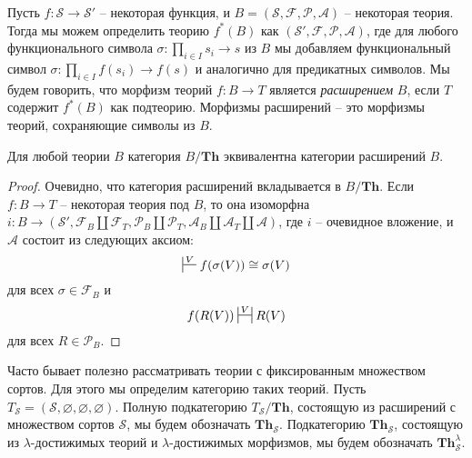 \documentclass[reqno]{amsart}
\theoremstyle{definition}
\theoremstyle{remark}
\newcommand{\bcat}[1]{\mathbf{#1}}
\newcommand{\Th}{\bcat{Th}}
\begin{document}
Пусть $f : \mathcal{S} \to \mathcal{S}'$ -- некоторая функция, и $B = (\mathcal{S},\mathcal{F},\mathcal{P},\mathcal{A})$ -- некоторая теория.
Тогда мы можем определить теорию $f^*(B)$ как $(\mathcal{S}',\mathcal{F},\mathcal{P},\mathcal{A})$,
где для любого функционального символа $\sigma : \prod_{i \in I} s_i \to s$ из $B$ мы добавляем функциональный символ $\sigma : \prod_{i \in I} f(s_i) \to f(s)$ и аналогично для предикатных символов.
Мы будем говорить, что морфизм теорий $f : B \to T$ является \emph{расширением} $B$, если $T$ содержит $f^*(B)$ как подтеорию.
Морфизмы расширений -- это морфизмы теорий, сохраняющие символы из $B$.

\begin{lem}[th-ext]
Для любой теории $B$ категория $B/\Th$ эквивалентна категории расширений $B$.
\end{lem}
\begin{proof}
Очевидно, что категория расширений вкладывается в $B/\Th$.
Если $f : B \to T$ -- некоторая теория под $B$, то она изоморфна $i : B \to (\mathcal{S}', \mathcal{F}_B \amalg \mathcal{F}_T, \mathcal{P}_B \amalg \mathcal{P}_T, \mathcal{A}_B \amalg \mathcal{A}_T \amalg \mathcal{A})$,
где $i$ -- очевидное вложение, и $\mathcal{A}$ состоит из следующих аксиом:
\[ \sststile{}{V} f(\sigma(V)) \cong \sigma(V) \]
для всех $\sigma \in \mathcal{F}_B$ и
\[ f(R(V)) \ssststile{}{V} R(V) \]
для всех $R \in \mathcal{P}_B$.
\end{proof}

Часто бывает полезно рассматривать теории с фиксированным множеством сортов.
Для этого мы определим категорию таких теорий.
Пусть $T_\mathcal{S} = (\mathcal{S},\varnothing,\varnothing,\varnothing)$.
Полную подкатегорию $T_\mathcal{S}/\Th$, состоящую из расширений с множеством сортов $\mathcal{S}$, мы будем обозначать $\Th_\mathcal{S}$.
Подкатегорию $\Th_\mathcal{S}$, состоящую из $\lambda$-достижимых теорий и $\lambda$-достижимых морфизмов, мы будем обозначать $\Th_\mathcal{S}^\lambda$.
\end{document}
